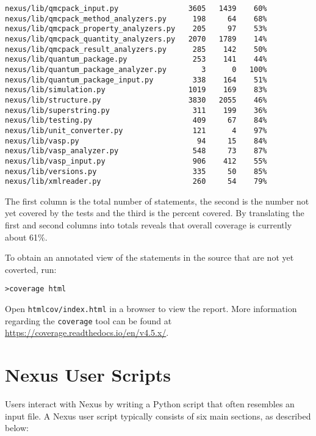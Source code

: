 \documentclass[oneside,11pt]{memoir}
\numberwithin{equation}{section}
\begin{document}
\begin{shaded}
\begin{verbatim}
nexus/lib/qmcpack_input.py                3605   1439    60%
nexus/lib/qmcpack_method_analyzers.py      198     64    68%
nexus/lib/qmcpack_property_analyzers.py    205     97    53%
nexus/lib/qmcpack_quantity_analyzers.py   2070   1789    14%
nexus/lib/qmcpack_result_analyzers.py      285    142    50%
nexus/lib/quantum_package.py               253    141    44%
nexus/lib/quantum_package_analyzer.py        3      0   100%
nexus/lib/quantum_package_input.py         338    164    51%
nexus/lib/simulation.py                   1019    169    83%
nexus/lib/structure.py                    3830   2055    46%
nexus/lib/superstring.py                   311    199    36%
nexus/lib/testing.py                       409     67    84%
nexus/lib/unit_converter.py                121      4    97%
nexus/lib/vasp.py                           94     15    84%
nexus/lib/vasp_analyzer.py                 548     73    87%
nexus/lib/vasp_input.py                    906    412    55%
nexus/lib/versions.py                      335     50    85%
nexus/lib/xmlreader.py                     260     54    79%
\end{verbatim}
\end{shaded}
The first column is the total number of statements, the second is the number not yet covered by the tests and the third is the percent covered.  By translating the first and second columns into totals reveals that overall coverage is currently about 61\%.

To obtain an annotated view of the statements in the source that are not yet coverted, run:
\begin{shaded}
\begin{verbatim}
>coverage html
\end{verbatim}
\end{shaded}
Open \texttt{htmlcov/index.html} in a browser to view the report.  More information regarding the \texttt{coverage} tool can be found at \url{https://coverage.readthedocs.io/en/v4.5.x/}.


\pagebreak
\chapter{Nexus User Scripts} \label{sec:user_scripts}

Users interact with Nexus by writing a Python script that often resembles an input file.  A Nexus user script typically consists of six main sections, as described below:
\end{document}
